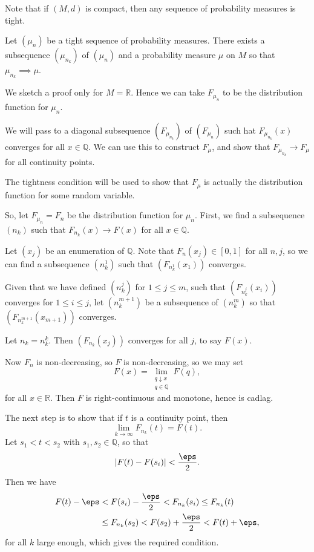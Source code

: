 \documentclass[12pt]{article}
\begin{document}
Note that if $(M, d)$ is compact, then any sequence of probability measures is tight.

\begin{theorem}
	Let $(\mu_n)$ be a tight sequence of probability measures. There exists a subsequence $(\mu_{n_k})$ of $(\mu_n)$ and a probability measure $\mu$ on $M$ so that $\mu_{n_k} \implies \mu$.
\end{theorem}

\begin{proofbox}
	
	We sketch a proof only for $M = \mathbb{R}$. Hence we can take $F_{\mu_n}$ to be the distribution function for $\mu_n$.

	We will pass to a diagonal subsequence $(F_{\mu_{n_k}})$ of $(F_{\mu_n})$ such hat $F_{\mu_{n_k}}(x)$ converges for all $x \in \mathbb{Q}$. We can use this to construct $F_\mu$, and show that $F_{\mu_{n_k}} \to F_{\mu}$ for all continuity points.

	The tightness condition will be used to show that $F_\mu$ is actually the distribution function for some random variable.

	So, let $F_{\mu_n} = F_n$ be the distribution function for $\mu_n$. First, we find a subsequence $(n_k)$ such that $F_{n_k}(x) \to F(x)$ for all $x \in \mathbb{Q}$.

	Let $(x_j)$ be an enumeration of $\mathbb{Q}$. Note that $F_n(x_j) \in [0, 1]$ for all  $n, j$, so we can find a subsequence $(n_k^1)$ such that $(F_{n_k^1}(x_1))$ converges.

	Given that we have defined $(n_k^{j})$ for $1 \leq j \leq m$, such that $(F_{n_k^j}(x_i))$ converges for $1 \leq i \leq j$, let $(n_k^{m+1})$ be a subsequence of $(n_k^m)$ so that $(F_{n_k^{m+1}}(x_{m+1}))$ converges.

	Let $n_k = n_k^k$. Then $(F_{n_k}(x_j))$ converges for all $j$, to say $F(x)$.

	Now $F_n$ is non-decreasing, so $F$ is non-decreasing, so we may set
	\[
		F(x) = \lim_{\substack{q \downarrow x \\ q \in \mathbb{Q}}} F(q),
	\]
	for all $x \in \mathbb{R}$. Then $F$ is right-continuous and monotone, hence is cadlag.

	The next step is to show that if $t$ is a continuity point, then
	\[
	\lim_{k \to \infty} F_{n_k}(t) = F(t).
	\]
	Let $s_1 < t < s_2$ with $s_1, s_2 \in \mathbb{Q}$, so that
	\[
	|F(t) - F(s_i)| < \frac{\eps}{2}.
	\]
	Then we have
	\begin{align*}
		F(t) - \eps &< F(s_i) - \frac{\eps}{2} < F_{n_k}(s_i) \leq F_{n_k}(t) \\
			    &\leq F_{n_k}(s_2) < F(s_2) + \frac{\eps}{2} < F(t) + \eps,
	\end{align*}
	for all $k$ large enough, which gives the required condition.


\end{proofbox}
\end{document}
